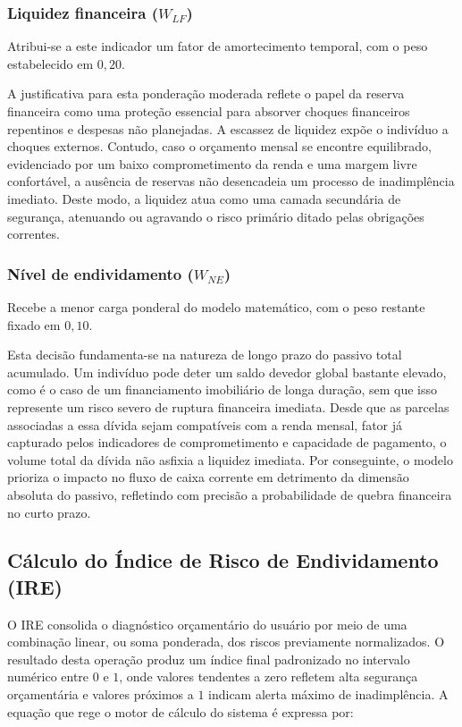 \documentclass[portuguese]{sbc2025}%
\begin{document}
\subsubsection{Liquidez financeira ($W_{LF}$)}

Atribui-se a este indicador um fator de amortecimento temporal, com o peso estabelecido em $0{,}20$.

A justificativa para esta ponderação moderada reflete o papel da reserva financeira como uma proteção essencial para absorver choques financeiros repentinos e despesas não planejadas. A escassez de liquidez expõe o indivíduo a choques externos. Contudo, caso o orçamento mensal se encontre equilibrado, evidenciado por um baixo comprometimento da renda e uma margem livre confortável, a ausência de reservas não desencadeia um processo de inadimplência imediato. Deste modo, a liquidez atua como uma camada secundária de segurança, atenuando ou agravando o risco primário ditado pelas obrigações correntes.

\subsubsection{Nível de endividamento ($W_{NE}$)}

Recebe a menor carga ponderal do modelo matemático, com o peso restante fixado em $0{,}10$.

Esta decisão fundamenta-se na natureza de longo prazo do passivo total acumulado. Um indivíduo pode deter um saldo devedor global bastante elevado, como é o caso de um financiamento imobiliário de longa duração, sem que isso represente um risco severo de ruptura financeira imediata. Desde que as parcelas associadas a essa dívida sejam compatíveis com a renda mensal, fator já capturado pelos indicadores de comprometimento e capacidade de pagamento, o volume total da dívida não asfixia a liquidez imediata. Por conseguinte, o modelo prioriza o impacto no fluxo de caixa corrente em detrimento da dimensão absoluta do passivo, refletindo com precisão a probabilidade de quebra financeira no curto prazo.

\subsection{Cálculo do Índice de Risco de Endividamento (IRE)}

O IRE consolida o diagnóstico orçamentário do usuário por meio de uma combinação linear, ou soma ponderada, dos riscos previamente normalizados. O resultado desta operação produz um índice final padronizado no intervalo numérico entre $0$ e $1$, onde valores tendentes a zero refletem alta segurança orçamentária e valores próximos a $1$ indicam alerta máximo de inadimplência. A equação que rege o motor de cálculo do sistema é expressa por:
\end{document}
